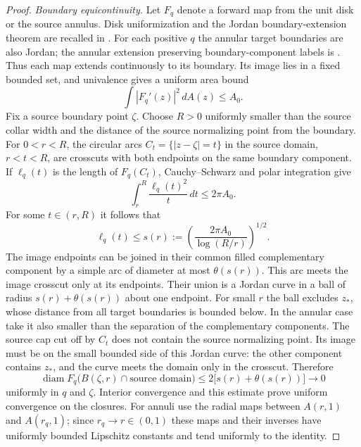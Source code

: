 \documentclass[11pt]{article}
\theoremstyle{definition}
\theoremstyle{remark}
\numberwithin{equation}{section}
\begin{document}
\begin{proof}
\emph{Boundary equicontinuity.}
Let $F_q$ denote a forward map from the unit disk or the source
annulus. Disk uniformization and the Jordan boundary-extension theorem
are recalled in \cite[Theorems~1.2.1--1.2.2]{Papamichael2008}.
For each positive $q$ the annular target boundaries are also Jordan;
the annular extension preserving boundary-component labels is
\cite[Theorem~1.3.2]{Papamichael2008}.
Thus each map extends continuously to its boundary. Its image lies in
a fixed bounded set, and univalence gives a uniform area bound
\[
                      \int |F_q'(z)|^2\,dA(z)\le A_0.
\]
Fix a source boundary point $\zeta$.  Choose $R>0$ uniformly smaller
than the source collar width and the distance of the source normalizing
point from the boundary.  For $0<r<R$, the circular arcs
$C_t=\{|z-\zeta|=t\}$ in the source domain, $r<t<R$, are crosscuts
with both endpoints on the same boundary component.  If
$\ell_q(t)$ is the length of $F_q(C_t)$, Cauchy--Schwarz and polar
integration give
\[
 \int_r^R \frac{\ell_q(t)^2}{t}\,dt\le 2\pi A_0.
\]
For some $t\in(r,R)$ it follows that
\begin{equation}\label{if:short-crosscut}
 \ell_q(t)\le s(r):=
       \left(\frac{2\pi A_0}{\log(R/r)}\right)^{1/2}.
\end{equation}
The image endpoints can be joined in their common filled complementary
component by a simple arc of diameter at most $\theta(s(r))$.
This arc meets the image crosscut only at its endpoints.  Their union
is a Jordan curve in a ball of radius $s(r)+\theta(s(r))$ about one
endpoint.  For small $r$ the ball excludes $z_*$, whose distance from
all target boundaries is bounded below.  In the annular case take it
also smaller than the separation of the complementary components.
The source cap cut off by $C_t$ does not contain the source normalizing
point.  Its image must be on the small bounded side of this Jordan
curve: the other component contains $z_*$, and the curve meets the
domain only in the crosscut.  Therefore
\begin{equation}\label{if:boundary-modulus}
 \operatorname{diam}F_q\bigl(B(\zeta,r)\cap\text{source domain}\bigr)
       \le 2\bigl[s(r)+\theta(s(r))\bigr]\longrightarrow0
\end{equation}
uniformly in $q$ and $\zeta$.  Interior convergence and this estimate
prove uniform convergence on the closures.  For annuli use the radial
maps between $A(r,1)$ and $A(r_q,1)$; since $r_q\to r\in(0,1)$ these
maps and their inverses have uniformly bounded Lipschitz constants
and tend uniformly to the identity.


\end{proof}
\end{document}
